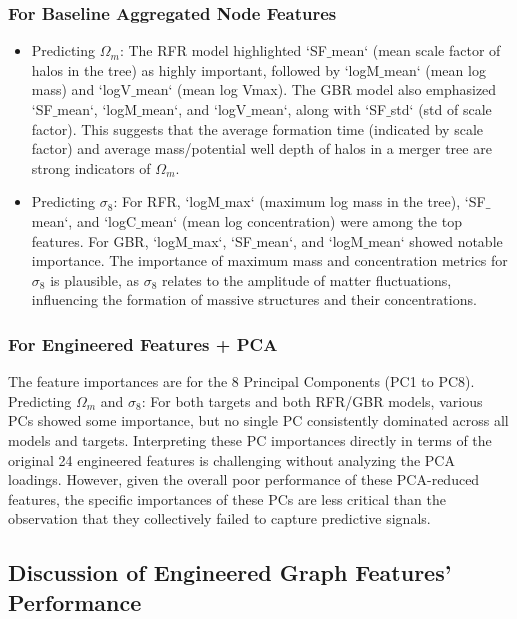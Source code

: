 \documentclass[twocolumn]{aastex631}
\begin{document}
\subsubsection{For Baseline Aggregated Node Features}
\begin{itemize}
    \item Predicting $\Omega_m$:
    The RFR model highlighted `SF\ensuremath{\_}mean` (mean scale factor of halos in the tree) as highly important, followed by `logM\ensuremath{\_}mean` (mean log mass) and `logV\ensuremath{\_}mean` (mean log Vmax). The GBR model also emphasized `SF\ensuremath{\_}mean`, `logM\ensuremath{\_}mean`, and `logV\ensuremath{\_}mean`, along with `SF\ensuremath{\_}std` (std of scale factor). This suggests that the average formation time (indicated by scale factor) and average mass/potential well depth of halos in a merger tree are strong indicators of $\Omega_m$.
    \item Predicting $\sigma_8$:
    For RFR, `logM\ensuremath{\_}max` (maximum log mass in the tree), `SF\ensuremath{\_}mean`, and `logC\ensuremath{\_}mean` (mean log concentration) were among the top features. For GBR, `logM\ensuremath{\_}max`, `SF\ensuremath{\_}mean`, and `logM\ensuremath{\_}mean` showed notable importance. The importance of maximum mass and concentration metrics for $\sigma_8$ is plausible, as $\sigma_8$ relates to the amplitude of matter fluctuations, influencing the formation of massive structures and their concentrations.
\end{itemize}

\subsubsection{For Engineered Features + PCA}
The feature importances are for the 8 Principal Components (PC1 to PC8). Predicting $\Omega_m$ and $\sigma_8$: For both targets and both RFR/GBR models, various PCs showed some importance, but no single PC consistently dominated across all models and targets. Interpreting these PC importances directly in terms of the original 24 engineered features is challenging without analyzing the PCA loadings. However, given the overall poor performance of these PCA-reduced features, the specific importances of these PCs are less critical than the observation that they collectively failed to capture predictive signals.

\subsection{Discussion of Engineered Graph Features' Performance}
\end{document}
